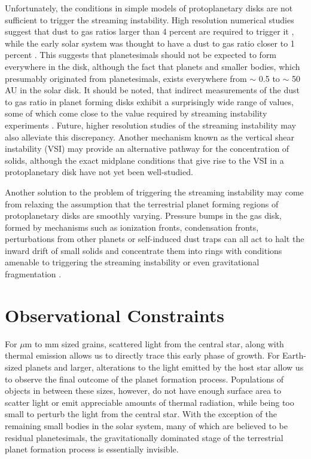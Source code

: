 Unfortunately, the conditions in simple models of protoplanetary disks are not sufficient to trigger the streaming instability. High resolution numerical studies suggest that dust to gas ratios larger than 4 percent are required to trigger it \cite{carrera15, yang17}, while the early solar system was thought to have a dust to gas ratio closer to 1 percent \cite{hayashi81}. This suggests that planetesimals should not be expected to form everywhere in the disk, although the fact that planets and smaller bodies, which presumably originated from planetesimals, exists everywhere from $\sim$ 0.5 to $\sim$ 50 AU in the solar disk. It should be noted, that indirect measurements of the dust to gas ratio in planet forming disks exhibit a surprisingly wide range of values, some of which come close to the value required by streaming instability experiments \cite{rich21, jermyn22}. Future, higher resolution studies of the streaming instability may also alleviate this discrepancy. Another mechanism known as the vertical shear instability (VSI) \cite{urpin98} may provide an alternative pathway for the concentration of solids, although the exact midplane conditions that give rise to the VSI in a protoplanetary disk have not yet been well-studied.

Another solution to the problem of triggering the streaming instability may come from relaxing the assumption that the terrestrial planet forming regions of protoplanetary disks are smoothly varying. Pressure bumps in the gas disk, formed by mechanisms such as ionization fronts, condensation fronts, perturbations from other planets or self-induced dust traps \cite{gonzalez17} can all act to halt the inward drift of small solids and concentrate them into rings with conditions amenable to triggering the streaming instability or even gravitational fragmentation \cite{chatterjee14, izidoro21, morbidelli21, batygin23a}.

\section{Observational Constraints}\label{sec:obsConstraints}

For $\mu$m to mm sized grains, scattered light from the central star, along with thermal emission allows us to directly trace this early phase of growth. For Earth-sized planets and larger, alterations to the light emitted by the host star allow us to observe the final outcome of the planet formation process. Populations of objects in between these sizes, however, do not have enough surface area to scatter light or emit appreciable amounts of thermal radiation, while being too small to perturb the light from the central star. With the exception of the remaining small bodies in the solar system, many of which are believed to be residual planetesimals, the gravitationally dominated stage of the terrestrial planet formation process is essentially invisible.

